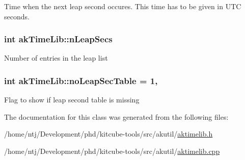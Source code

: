 Time when the next leap second occures. This time has to be given in U\-T\-C seconds. \hypertarget{classakTimeLib_a95186789b9668d0b3a242ac8a57bf634}{
\subsubsection[{n\-Leap\-Secs}]{\setlength{\rightskip}{0pt plus 5cm}int ak\-Time\-Lib\-::n\-Leap\-Secs\hspace{0.3cm}{\ttfamily [private]}}}\label{classakTimeLib_a95186789b9668d0b3a242ac8a57bf634}
Number of entries in the leap list \hypertarget{classakTimeLib_ad6b1a7cd89c1cccd32277b7c5442a597}{
\subsubsection[{no\-Leap\-Sec\-Table}]{\setlength{\rightskip}{0pt plus 5cm}int ak\-Time\-Lib\-::no\-Leap\-Sec\-Table = 1\hspace{0.3cm}{\ttfamily [static]}, {\ttfamily [private]}}}\label{classakTimeLib_ad6b1a7cd89c1cccd32277b7c5442a597}
Flag to show if leap second table is missing 

The documentation for this class was generated from the following files\-:\begin{DoxyCompactItemize}
\item 
/home/ntj/\-Development/phd/kitcube-\/tools/src/akutil/\hyperlink{aktimelib_8h}{aktimelib.\-h}\item 
/home/ntj/\-Development/phd/kitcube-\/tools/src/akutil/\hyperlink{aktimelib_8cpp}{aktimelib.\-cpp}\end{DoxyCompactItemize}
